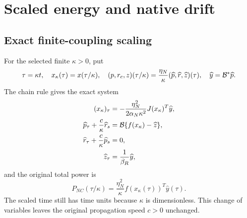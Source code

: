 \section{Scaled energy and native drift}\label{sec:energy}
\subsection{Exact finite-coupling scaling}\label{sec:scaling}
For the selected finite $\kappa>0$, put
\begin{equation}\label{eq:scaling}
\tau=\kappa t,\quad x_\kappa(\tau)=x(\tau/\kappa),\quad
(p,r_c,z)(\tau/\kappa)=\frac{\eta_N}{\kappa}
(\widehat p,\widehat r,\widehat z)(\tau),\quad
\widehat y=\mathcal B^*\widehat p.
\end{equation}
The chain rule gives the exact system
\begin{equation}\label{eq:scaledsystem}
\begin{aligned}
(x_\kappa)_\tau&=-\frac{\eta_N^2}{2\alpha_N\kappa^2}J(x_\kappa)^T\widehat y,\\
\widehat p_\tau+\frac c\kappa\widehat r_s&=\mathcal B\{f(x_\kappa)-\widehat z\},\\
\widehat r_\tau+\frac c\kappa\widehat p_s&=0,\\
\widehat z_\tau&=\frac1{\beta_R}\widehat y,
\end{aligned}
\end{equation}
and the original total power is
\begin{equation}\label{eq:powerconversion}
P_{NC}(\tau/\kappa)=\frac{\eta_N^2}{\kappa}
f(x_\kappa(\tau))^T\widehat y(\tau).
\end{equation}
The scaled time still has time units because $\kappa$ is dimensionless. This change of variables leaves the original propagation speed $c>0$ unchanged.

